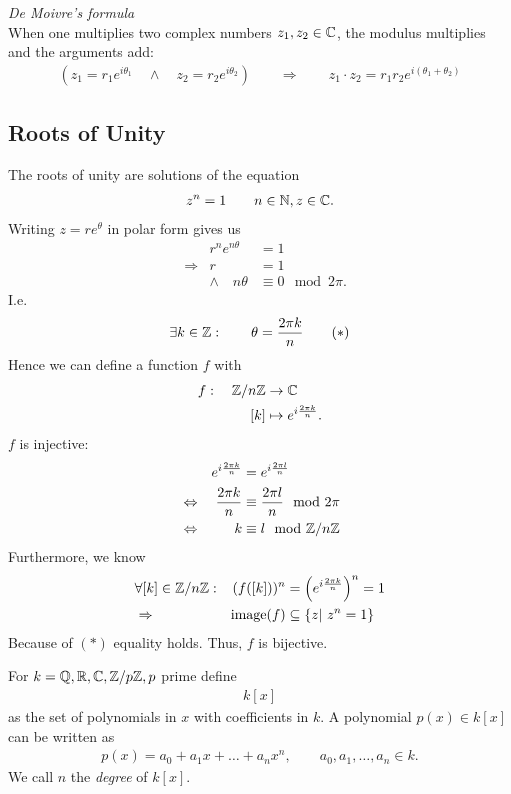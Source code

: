 \begin{tm}
	\emph{De Moivre's formula} \\
	When one multiplies two complex numbers $z_1, z_2 \in \mathbb C$, the modulus multiplies and the arguments add:
	\begin{align*}
	\left(z_1= r_1 e^{i\theta_1} \quad \wedge \quad z_2 = r_2 e^{i\theta_2}\right) \qquad \Rightarrow \qquad z_1 \cdot z_2 = r_1 r_2 e^{i(\theta_1 + \theta_2)}
	\end{align*}
\end{tm}


\subsection{Roots of Unity}
The roots of unity are solutions of the equation
\begin{align*}
z^n = 1 \qquad n \in \mathbb N, z \in \mathbb C.
\end{align*}
Writing $z = re^\theta$ in polar form gives us
\begin{align*}
& &r^n e^{n\theta} & = 1 \\
& \Rightarrow & r & = 1 \\
& & \wedge \quad n\theta & \equiv 0 \mod 2\pi.
\end{align*}
I.e.
\begin{align*}
\exists k \in \mathbb Z: \qquad \theta = \frac{2\pi k}{n} \tag{$*$}
\end{align*}
Hence we can define a function $f$ with
\begin{align*}
f: \quad \mathbb Z/n\mathbb Z & \to \mathbb C \\
[k] & \mapsto e^{i \frac {2\pi k}{n}}. 
\end{align*}
$f$ is injective:
\begin{align*}
& & e^{i \frac {2\pi k}{n}} & = e^{i \frac {2\pi l}{n}} \\
& \Leftrightarrow & \frac {2\pi k}{n}  & \equiv \frac {2\pi l}{n} \mod 2 \pi \\
& \Leftrightarrow & k  & \equiv l \mod {\mathbb Z}/n\mathbb Z
\end{align*}
Furthermore, we know
\begin{align*}
& \forall [k] \in \mathbb Z/n\mathbb Z: & (f([k]))^n & = \left(e^{i \frac{2 \pi k} n} \right)^n = 1 \\
& \Rightarrow & \operatorname{image}(f) & \subseteq \{z| ~z^n=1 \}
\end{align*}
Because of $(*)$ equality holds. Thus, $f$ is bijective.

\begin{df}
	For $k=\mathbb Q, \mathbb R, \mathbb C, \mathbb Z/p\mathbb Z, p$ prime define
	\begin{align*}
	k[x]
	\end{align*}
	as the set of polynomials in $x$ with coefficients in $k$. A polynomial $p(x) \in k[x]$ can be written as 
	\begin{align*}
	p(x) = a_0 + a_1 x + \dots + a_n x^n, \qquad a_0, a_1, \dots, a_n \in k.
	\end{align*}
	We call $n$ the \emph{degree} of $k[x]$.
\end{df}

